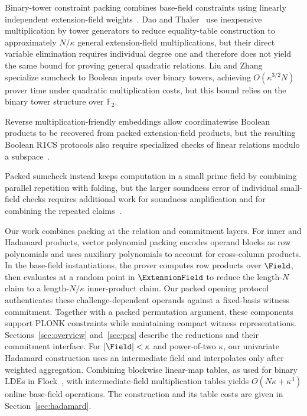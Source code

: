 Binary-tower constraint packing combines base-field constraints
using linearly independent extension-field
weights~\cite{eurocrypt/DiamondP25,iacr/DaoT24}.
Dao and Thaler~\cite{iacr/DaoT24} use inexpensive multiplication
by tower generators to reduce equality-table construction to
approximately \(N/\kappa\) general extension-field multiplications,
but their direct variable elimination requires individual
degree one and therefore does not yield the same bound for
proving general quadratic relations.
Liu and Zhang~\cite{iacr/LiuZ25} specialize sumcheck to Boolean
inputs over binary towers, achieving \(O(\kappa^{3/2}N)\)
prover time under quadratic multiplication costs, but this
bound relies on the binary tower structure over
\(\mathbb{F}_2\).


Reverse multiplication-friendly embeddings allow coordinatewise
Boolean products to be recovered from packed extension-field
products, but the resulting Boolean R1CS protocols also require
specialized checks of linear relations modulo a
subspace~\cite{iacr/CascudoG21}.

Packed sumcheck instead keeps computation in a small prime
field by combining parallel repetition with folding, but
the larger soundness error of individual small-field checks
requires additional work for soundness amplification and
for combining the repeated
claims~\cite{iacr/WeiWXZDWZ25}.


\medskip
{}
Our work combines packing at the relation and commitment layers.
For inner and Hadamard products, vector polynomial packing
encodes operand blocks as row polynomials and uses auxiliary
polynomials to account for cross-column products.
In the base-field instantiations, the prover computes row
products over \(\Field\), then evaluates at a random point in
\(\ExtensionField\) to reduce
the length-\(N\) claim to a length-\(N/\kappa\) inner-product
claim.
Our packed opening protocol authenticates these
challenge-dependent operands against a fixed-basis witness
commitment.
Together with a packed permutation argument, these components
support PLONK constraints while maintaining compact witness
representations.
Sections~\ref{sec:overview} and~\ref{sec:pcs} describe the
reductions and their commitment interface.
For \(|\Field|<\kappa\) and power-of-two \(\kappa\), our
univariate Hadamard construction
uses an intermediate field and interpolates only after weighted
aggregation. Combining blockwise linear-map tables, as used for
binary LDEs in Flock~\cite{iacr/BunzRW26}, with intermediate-field
multiplication tables yields \(O(N\kappa+\kappa^3)\) online
base-field operations. The construction and its table costs
are given in Section~\ref{sec:hadamard}.


